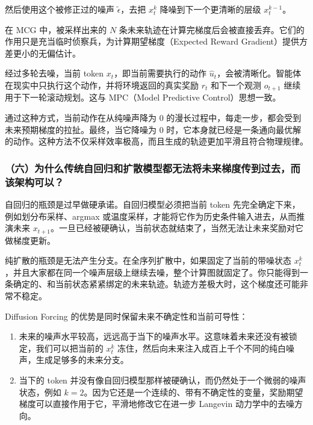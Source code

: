 然后使用这个被修正过的噪声 \(\tilde{\epsilon}\)，去把 \(x_t^k\) 降噪到下一个更清晰的层级 \(x_t^{k-1}\)。

在 MCG 中，被采样出来的 \(N\) 条未来轨迹在计算完梯度后会被直接丢弃。它们的作用只是充当临时侦察兵，为计算期望梯度（Expected Reward Gradient）提供方差更小的无偏估计。

经过多轮去噪，当前 token \(x_t\)，即当前需要执行的动作 \(\hat{u}_t\)，会被清晰化。智能体在现实中只执行这个动作，并将环境返回的真实奖励 \(r_t\) 和下一个观测 \(o_{t+1}\) 继续用于下一轮滚动规划。这与 MPC（Model Predictive Control）思想一致。

通过这种方式，当前动作在从纯噪声降为 0 的漫长过程中，每走一步，都会受到未来预期梯度的拉扯。最终，当它降噪为 0 时，它本身就已经是一条通向最优解的动作。这种方法不仅采样效率极高，而且生成的轨迹更加平滑且符合物理规律。

\hypertarget{ux516dux4e3aux4ec0ux4e48ux4f20ux7edfux81eaux56deux5f52ux548cux6269ux6563ux6a21ux578bux90fdux65e0ux6cd5ux5c06ux672aux6765ux68afux5ea6ux4f20ux5230ux8fc7ux53bbux800cux8be5ux67b6ux6784ux53efux4ee5}{%
\subsubsection{（六）为什么传统自回归和扩散模型都无法将未来梯度传到过去，而该架构可以？}\label{ux516dux4e3aux4ec0ux4e48ux4f20ux7edfux81eaux56deux5f52ux548cux6269ux6563ux6a21ux578bux90fdux65e0ux6cd5ux5c06ux672aux6765ux68afux5ea6ux4f20ux5230ux8fc7ux53bbux800cux8be5ux67b6ux6784ux53efux4ee5}}

自回归的瓶颈是过早做硬承诺。自回归模型必须把当前 token 先完全确定下来，例如划分布采样、argmax 或温度采样，才能将它作为历史条件输入进去，从而推演未来 \(x_{t+1}\)。一旦已经被硬确认，当前状态就结束了，当然无法让未来奖励对它做梯度更新。

纯扩散的瓶颈是无法产生分支。在全序列扩散中，如果固定了当前的带噪状态 \(x_t^k\)，并且大家都在同一个噪声层级上继续去噪，整个计算图就固定了。你只能得到一条确定的、和当前状态紧紧绑定的未来轨迹。轨迹方差极大时，这个梯度还可能非常不稳定。

Diffusion Forcing 的优势是同时保留未来不确定性和当前可导性：

\begin{enumerate}
\def\labelenumi{\arabic{enumi}.}
\tightlist
\item
  未来的噪声水平较高，远远高于当下的噪声水平。这意味着未来还没有被锁定，我们可以把当前的 \(x_t^k\) 冻住，然后向未来注入成百上千个不同的纯白噪声，生成足够多的未来分支。
\item
  当下的 token 并没有像自回归模型那样被硬确认，而仍然处于一个微弱的噪声状态，例如 \(k=2\)。因为它还是一个连续的、带有不确定性的变量，奖励期望梯度可以直接作用于它，平滑地修改它在进一步 Langevin 动力学中的去噪方向。
\end{enumerate}

